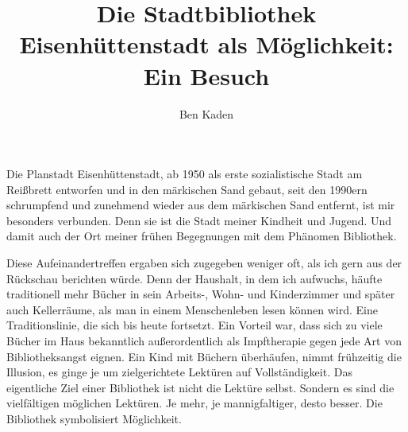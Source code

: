 \documentclass[a4paper,
fontsize=11pt,
oneside,
numbers=noperiodatend,
parskip=half-,
bibliography=totoc,
final
]{scrartcl}
\title{\LARGE{Die Stadtbibliothek Eisenhüttenstadt als Möglichkeit: Ein Besuch}} %
\author{Ben Kaden} %
\date{}
\begin{document}
\maketitle
\thispagestyle{fancyplain} 


Die Planstadt Eisenhüttenstadt, ab 1950 als erste sozialistische Stadt
am Reißbrett entworfen und in den märkischen Sand gebaut, seit den
1990ern schrumpfend und zunehmend wieder aus dem märkischen Sand
entfernt, ist mir besonders verbunden. Denn sie ist die Stadt meiner
Kindheit und Jugend. Und damit auch der Ort meiner frühen Begegnungen
mit dem Phänomen Bibliothek.

Diese Aufeinandertreffen ergaben sich zugegeben weniger oft, als ich
gern aus der Rückschau berichten würde. Denn der Haushalt, in dem ich
aufwuchs, häufte traditionell mehr Bücher in sein Arbeits-, Wohn- und
Kinderzimmer und später auch Kellerräume, als man in einem Menschenleben
lesen können wird. Eine Traditionslinie, die sich bis heute fortsetzt.
Ein Vorteil war, dass sich zu viele Bücher im Haus bekanntlich
außerordentlich als Impftherapie gegen jede Art von Bibliotheksangst
eignen. Ein Kind mit Büchern überhäufen, nimmt frühzeitig die Illusion,
es ginge je um zielgerichtete Lektüren auf Vollständigkeit. Das
eigentliche Ziel einer Bibliothek ist nicht die Lektüre selbst. Sondern
es sind die vielfältigen möglichen Lektüren. Je mehr, je mannigfaltiger,
desto besser. Die Bibliothek symbolisiert Möglichkeit.
\end{document}
